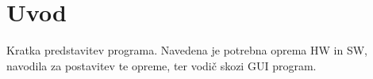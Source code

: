 %
\chapter{Uvod}

Kratka predstavitev programa. Navedena je potrebna oprema HW in SW, navodila za postavitev te opreme, ter vodič skozi GUI program.

